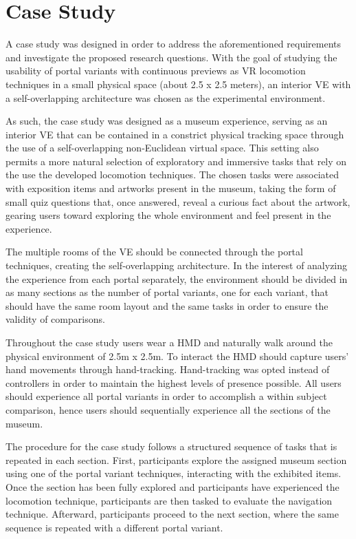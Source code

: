 \section{Case Study}
\label{sec:case-study}

A case study was designed in order to address the aforementioned requirements and investigate the proposed research questions. 
With the goal of studying the usability of portal variants with continuous previews as \gls{VR} locomotion techniques in a small 
physical space (about 2.5 x 2.5 meters), an interior \gls{VE} with a self-overlapping architecture was chosen as the experimental 
environment.

As such, the case study was designed as a museum experience, serving as an interior \gls{VE} that can be contained in a constrict physical tracking 
space through the use of a self-overlapping non-Euclidean virtual space. This setting also permits a more natural selection of exploratory  and 
immersive tasks that rely on the use the developed locomotion techniques. The chosen tasks were associated with exposition items and artworks 
present in the museum, taking the form of small quiz questions that, once answered, reveal a curious fact about the artwork, gearing users 
toward exploring the whole environment and feel present in the experience.

The multiple rooms of the \gls{VE} should be connected through the portal techniques, creating the self-overlapping architecture. In the interest 
of analyzing the experience from each portal separately, the environment should be divided in as many sections as the number of portal variants, one 
for each variant, that should have the same room layout and the same tasks in order to ensure the validity of comparisons.

Throughout the case study users wear a \gls{HMD} and naturally walk around the physical environment of 2.5m x 2.5m. To interact the \gls{HMD} 
should capture users' hand movements through hand-tracking. Hand-tracking was opted instead of controllers in order to maintain the highest levels 
of presence possible. All users should experience all portal variants in order to accomplish a within subject comparison, hence users should 
sequentially experience all the sections of the museum.

The procedure for the case study follows a structured sequence of tasks that is repeated in each section. 
First, participants explore the assigned museum section using one of the portal variant techniques, interacting with the exhibited items. 
Once the section has been fully explored and participants have experienced the locomotion technique, participants are then tasked to evaluate the 
navigation technique.
Afterward, participants proceed to the next section, where the same sequence is repeated with a different portal variant.

